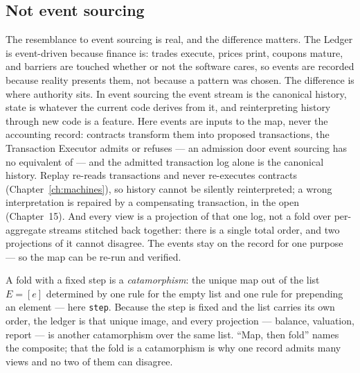 \subsection{Not event sourcing}

The resemblance to event sourcing is real, and the difference matters. The Ledger is
event-driven because finance is: trades execute, prices print, coupons mature, and
barriers are touched whether or not the software cares, so events are recorded because
reality presents them, not because a pattern was chosen. The difference is where authority
sits. In event sourcing the event stream is the canonical history, state is whatever the
current code derives from it, and reinterpreting history through new code is a feature.
Here events are inputs to the map, never the accounting record: contracts transform them
into proposed transactions, the Transaction Executor admits or refuses --- an admission
door event sourcing has no equivalent of --- and the admitted transaction log alone is the
canonical history. Replay re-reads transactions and never re-executes contracts
(Chapter~\ref{ch:machines}), so history cannot be silently reinterpreted; a wrong
interpretation is repaired by a compensating transaction, in the open (Chapter~15). And
every view is a projection of that one log, not a fold over per-aggregate streams stitched
back together: there is a single total order, and two projections of it cannot disagree.
The events stay on the record for one purpose --- so the map can be re-run and verified.

\begin{secondtelling}
A fold with a fixed step is a \emph{catamorphism}: the unique map out of the list $E=[e]$
determined by one rule for the empty list and one rule for prepending an element --- here
\texttt{step}. Because the step is fixed and the list carries its own order, the ledger is
that unique image, and every projection --- balance, valuation, report --- is another
catamorphism over the same list. ``Map, then fold'' names the composite; that the fold is
a catamorphism is why one record admits many views and no two of them can disagree.
\end{secondtelling}
